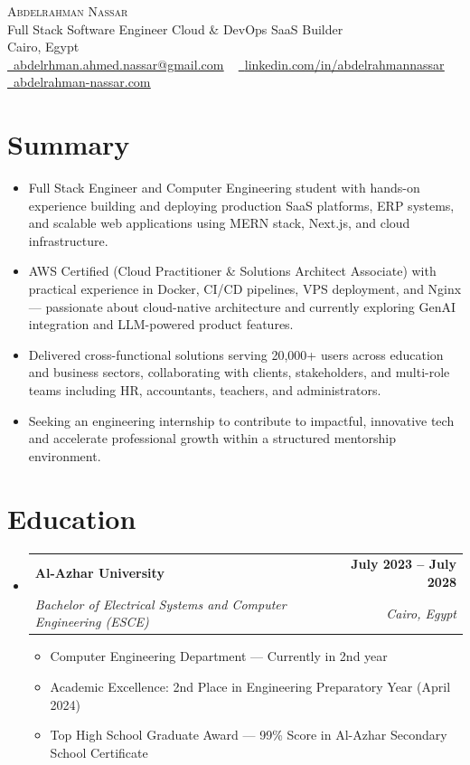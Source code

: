 \documentclass[letterpaper,11pt]{article}
\makeatletter
\newcommand{\resumeItem}[1]{
  \item\small{
    {#1 \vspace{-2pt}}
  }
}
\newcommand{\resumeSubheading}[4]{
  \vspace{-2pt}\item
    \begin{tabular*}{1.0\textwidth}[t]{l@{\extracolsep{\fill}}r}
      \textbf{#1} & \textbf{\small #2} \\
      \textit{\small#3} & \textit{\small #4} \\
    \end{tabular*}\vspace{-7pt}
}
\newcommand{\resumeSubHeadingListStart}{\begin{itemize}[leftmargin=0.0in, label={}]}
\newcommand{\resumeSubHeadingListEnd}{\end{itemize}}
\newcommand{\resumeItemListStart}{\begin{itemize}}
\newcommand{\resumeItemListEnd}{\end{itemize}\vspace{-5pt}}
\makeatother
\begin{document}
\begin{center}
    {\Huge \scshape Abdelrahman Nassar} \\ \vspace{5pt}
    Full Stack Software Engineer \textbar{} Cloud \& DevOps \textbar{} SaaS Builder \\ \vspace{5pt}
    Cairo, Egypt \\ \vspace{5pt}
    \small
    \href{mailto:abdelrhman.ahmed.nassar@gmail.com}{\raisebox{-0.2\height}\faEnvelope\  \underline{abdelrhman.ahmed.nassar@gmail.com}} ~
    \href{https://www.linkedin.com/in/abdelrahmannassar}{\raisebox{-0.2\height}\faLinkedin\ \underline{linkedin.com/in/abdelrahmannassar}}  ~
    \href{https://abdelrahman-nassar.com}{\raisebox{-0.2\height}\faGlobe\ \underline{abdelrahman-nassar.com}}
    \vspace{-8pt}
\end{center}

\section{Summary}
\vspace{-3pt}
\resumeSubHeadingListStart
  \resumeItem{Full Stack Engineer and Computer Engineering student with hands-on experience building and deploying production SaaS platforms, ERP systems, and scalable web applications using MERN stack, Next.js, and cloud infrastructure.}
  \resumeItem{AWS Certified (Cloud Practitioner \& Solutions Architect Associate) with practical experience in Docker, CI/CD pipelines, VPS deployment, and Nginx — passionate about cloud-native architecture and currently exploring GenAI integration and LLM-powered product features.}
  \resumeItem{Delivered cross-functional solutions serving 20,000+ users across education and business sectors, collaborating with clients, stakeholders, and multi-role teams including HR, accountants, teachers, and administrators.}
  \resumeItem{Seeking an engineering internship to contribute to impactful, innovative tech and accelerate professional growth within a structured mentorship environment.}
\resumeSubHeadingListEnd
\vspace{-10pt}


\section{Education}
  \resumeSubHeadingListStart
    \resumeSubheading
      {Al-Azhar University}{July 2023 -- July 2028}
      {Bachelor of Electrical Systems and Computer Engineering (ESCE)}{Cairo, Egypt}
      \resumeItemListStart
        \resumeItem{Computer Engineering Department — Currently in 2nd year}
        \resumeItem{Academic Excellence: 2nd Place in Engineering Preparatory Year (April 2024)}
        \resumeItem{Top High School Graduate Award — 99\% Score in Al-Azhar Secondary School Certificate}
      \resumeItemListEnd
  \resumeSubHeadingListEnd
\end{document}
